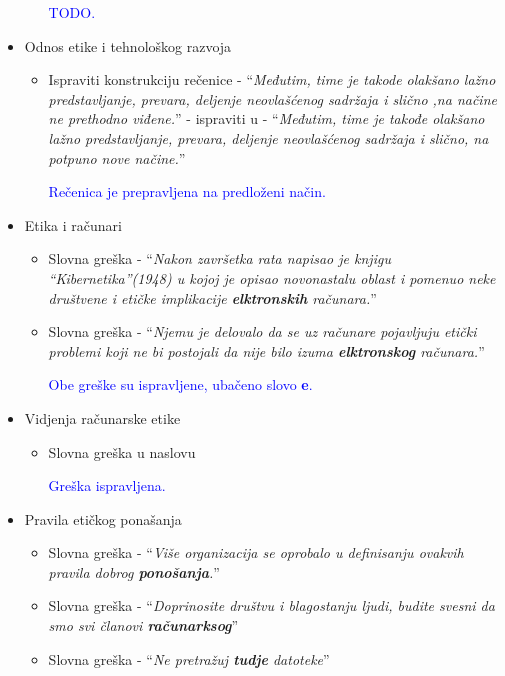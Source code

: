 \documentclass[a4paper]{report}
\newcommand{\odgovor}[1]{\textcolor{blue}{#1}}
\begin{document}
\begin{itemize}
\begin{itemize}
        \odgovor{TODO.}
    \end{itemize}
    \item Odnos etike i tehnološkog razvoja
    \begin{itemize}
        \item Ispraviti konstrukciju rečenice - ``\textit{Međutim, time je takode olakšano lažno predstavljanje, prevara, deljenje neovlašćenog sadržaja i slično ,na načine ne
prethodno viđene.}'' - ispraviti u - 
``\textit{Međutim, time je takođe olakšano lažno predstavljanje, prevara, deljenje neovlašćenog sadržaja i slično, na potpuno nove načine.}''

\odgovor{Rečenica je prepravljena na predloženi način.}

    \end{itemize}
    \item Etika i računari
    \begin{itemize}
        \item Slovna greška - ``\textit{Nakon završetka rata napisao je knjigu “Kibernetika”(1948) u kojoj je opisao novonastalu oblast i pomenuo neke društvene
i etičke implikacije \textbf{elktronskih} računara.}''
        \item Slovna greška - ``\textit{Njemu je delovalo da se uz računare pojavljuju etički problemi koji ne bi postojali da nije bilo izuma \textbf{elktronskog}
računara.}''

\odgovor{Obe greške su ispravljene, ubačeno slovo \textbf{e}.}

    \end{itemize}
    \item Vidjenja računarske etike
    \begin{itemize}
        \item Slovna greška u naslovu
        
        \odgovor{Greška ispravljena.}
        
    \end{itemize}
    \item Pravila etičkog ponašanja
    \begin{itemize}
        \item Slovna greška - ``\textit{Više organizacija se oprobalo u definisanju ovakvih pravila dobrog
\textbf{ponošanja}.}''
        \item Slovna greška - ``\textit{Doprinosite društvu i blagostanju ljudi, budite svesni da
smo svi članovi \textbf{računarksog}}''
        \item Slovna greška - ``\textit{Ne pretražuj \textbf{tudje} datoteke}''
        

\end{itemize}
\end{itemize}
\end{document}
